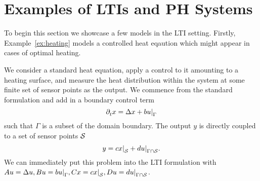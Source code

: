 \section{Examples of \aclp{LTI} and \acl{PH} Systems}

To begin this section we showcase a few models in the \ac{LTI} setting.
Firstly, Example~\ref{ex:heating} models a controlled heat eqaution which might appear in cases of optimal heating.

\begin{example}\label{ex:heating}
    We consider a standard heat equation, apply a control to it amounting to a heating surface, and measure the heat distribution within the system at some finite set of sensor points as the output.
    We commence from the standard formulation and add in a boundary control term
    \begin{equation*}
        \pd[t]{} x = \lapl{x} + b \res{u}{\Gamma}
    \end{equation*}
    such that $\Gamma$ is a subset of the domain boundary.
    The output $y$ is directly coupled to a set of sensor points $\mathcal{S}$
    \begin{equation*}
        y = c \res{x}{\mcl{S}} + d \res{u}{\Gamma \cap \mcl{S}}.
    \end{equation*}
    We can immediately put this problem into the \ac{LTI} formulation with $A u = \lapl{u}, B u = b \res{u}{\Gamma}, C x = c \res{x}{\mcl{S}}, D u = d \res{u}{\Gamma \cap \mcl{S}}$.
\end{example}

